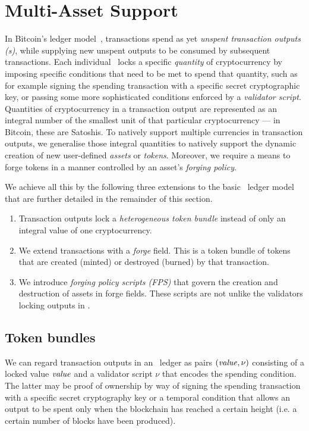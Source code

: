\section{Multi-Asset Support}
\label{sec:multicurrency}

In Bitcoin's ledger model~\cite{Nakamoto,formal-model-of-bitcoin-transactions,Zahnentferner18-UTxO}, transactions spend as yet \emph{unspent transaction outputs \textup{(}\!\UTXO{}s\textup{)}}, while supplying new unspent outputs to be consumed by subsequent transactions.
Each individual \UTXO\ locks a specific \emph{quantity} of cryptocurrency by imposing specific conditions that need to be met to spend that quantity, such as for example signing the spending transaction with a specific secret cryptographic key, or passing some more sophisticated conditions enforced by a \emph{validator script}.
Quantities of cryptocurrency in a transaction output are represented as an integral number of the smallest unit of that particular cryptocurrency --- in Bitcoin, these are Satoshis.
To natively support multiple currencies in transaction outputs, we generalise those integral quantities to natively support the dynamic creation of new user-defined \emph{assets} or \emph{tokens}. Moreover, we require a means to forge tokens in a manner controlled by an asset's \emph{forging policy}.

We achieve all this by the following three extensions to the basic \UTXO\ ledger model that are further detailed in
the remainder of this section.
%
\begin{enumerate}
\item Transaction outputs lock a \emph{heterogeneous token bundle} instead of only an integral value of one cryptocurrency.
\item We extend transactions with a \emph{forge} field. This is a token bundle of tokens that are created (minted) or destroyed (burned) by that transaction.
\item We introduce \emph{forging policy scripts \textup{(}FPS\textup{)}} that govern the creation and destruction of assets in forge fields. These scripts are not unlike the validators locking outputs in \UTXO.
\end{enumerate}

\subsection{Token bundles}

We can regard transaction outputs in an \UTXO\ ledger as pairs \((\mathit{value}, \nu)\) consisting of a locked value $\mathit{value}$ and a validator script $\nu$ that encodes the spending condition. The latter may be proof of ownership by way of signing the spending transaction with a specific secret cryptography key or a temporal condition that allows an output to be spent only when the blockchain has reached a certain height (i.e. a certain number of blocks have been produced).

